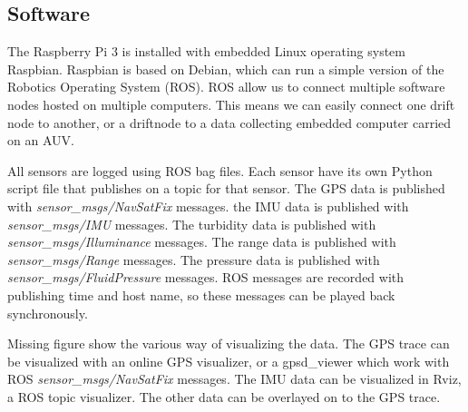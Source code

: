 \subsection[Software]{Software}

The Raspberry Pi 3 is installed with embedded Linux operating system Raspbian.
Raspbian is based on Debian, which can run a simple version of the Robotics Operating System (ROS).
ROS allow us to connect multiple software nodes hosted on multiple computers.
This means we can easily connect one drift node to another, or a driftnode to a data collecting embedded computer carried on an AUV.

All sensors are logged using ROS bag files.
Each sensor have its own Python script file that publishes on a topic for that sensor.
The GPS data is published with \textit{sensor\_msgs/NavSatFix} messages.
the IMU data is published with \textit{sensor\_msgs/IMU} messages.
The turbidity data is published with \textit{sensor\_msgs/Illuminance} messages.
The range data is published with \textit{sensor\_msgs/Range} messages.
The pressure data is published with \textit{sensor\_msgs/FluidPressure} messages.
ROS messages are recorded with publishing time and host name, so these messages can be played back synchronously.

Missing figure show the various way of visualizing the data.
The GPS trace can be visualized with an online GPS visualizer, or a gpsd\_viewer which work with ROS \textit{sensor\_msgs/NavSatFix} messages.
The IMU data can be visualized in Rviz, a ROS topic visualizer.
The other data can be overlayed on to the GPS trace.
